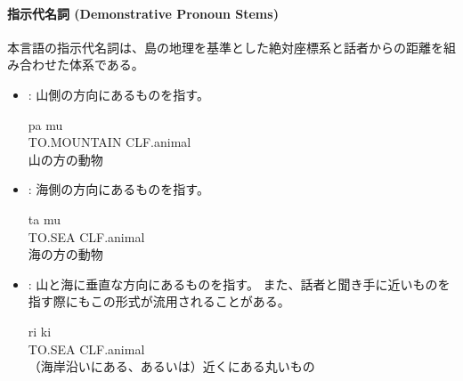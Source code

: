 \paragraph{指示代名詞 (Demonstrative Pronoun Stems)}
本言語の指示代名詞は、島の地理を基準とした絶対座標系と話者からの距離を組み合わせた体系である。

\begin{itemize}
    \item {} : {山側}の方向にあるものを指す。
        \begin{exe}
            \ex \gll pa mu \\
            TO.MOUNTAIN CLF.animal \\
            \glt 山の方の動物
        \end{exe}
    \item {} : {海側}の方向にあるものを指す。
        \begin{exe}
            \ex \gll ta mu \\
            TO.SEA CLF.animal \\
            \glt 海の方の動物
        \end{exe}
    \item {} : 山と海に{垂直な方向}にあるものを指す。
    また、話者と聞き手に近いものを指す際にもこの形式が流用されることがある。
        \begin{exe}
            \ex \gll ri ki \\
            TO.SEA CLF.animal \\
            \glt （海岸沿いにある、あるいは）近くにある丸いもの
        \end{exe}
\end{itemize}
